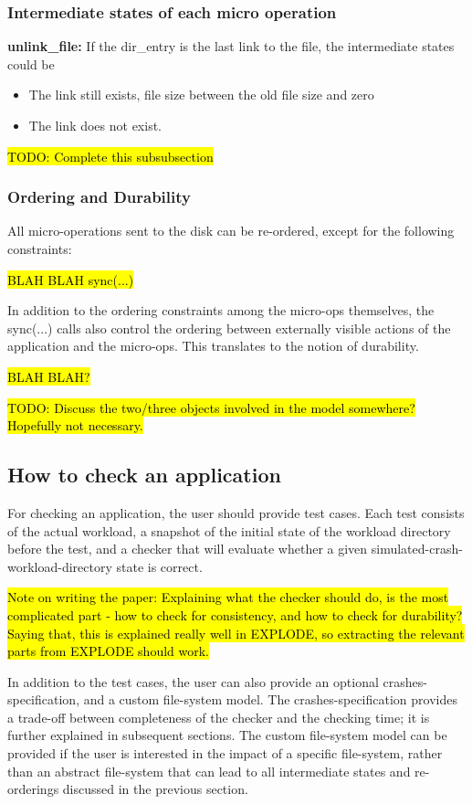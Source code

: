 \subsubsection{Intermediate states of each micro operation}
\noindent\textbf{unlink\_file:} If the dir\_entry is the last link to the file, the intermediate states could be
\begin{itemize}
\item The link still exists, file size between the old file size and zero
\item The link does not exist.
\end{itemize}
\hl{TODO: Complete this subsubsection}

\subsubsection{Ordering and Durability}
All micro-operations sent to the disk can be re-ordered, except for the following constraints:

\hl{BLAH BLAH sync(...)}

In addition to the ordering constraints among the micro-ops themselves, the sync(...) calls also control the ordering between externally visible actions of the application and the micro-ops. This translates to the notion of durability.

\hl{BLAH BLAH?}

\hl{TODO: Discuss the two/three objects involved in the model somewhere? Hopefully not necessary.}

\subsection{How to check an application}

For checking an application, the user should provide test cases. Each test consists of the actual workload, a snapshot of the initial state of the workload directory before the test, and a checker that will evaluate whether a given simulated-crash-workload-directory state is correct.

\hl{Note on writing the paper: Explaining what the checker should do, is the most complicated part - how to check for consistency, and how to check for durability? Saying that, this is explained really well in EXPLODE, so extracting the relevant parts from EXPLODE should work.}

In addition to the test cases, the user can also provide an optional crashes-specification, and a custom file-system model. The crashes-specification provides a trade-off between completeness of the checker and the checking time; it is further explained in subsequent sections. The custom file-system model can be provided if the user is interested in the impact of a specific file-system, rather than an abstract file-system that can lead to all intermediate states and re-orderings discussed in the previous section.



